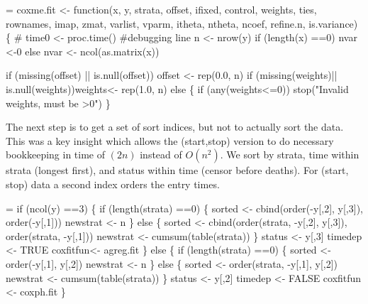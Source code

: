 \documentclass{article}
\begin{document}
\begin{nwchunk}
=
 coxme.fit <- function(x, y, strata, offset, ifixed, control,
                         weights, ties, rownames, 
                         imap, zmat, varlist, vparm, itheta,
                         ntheta, ncoef, refine.n, is.variance) \{
     #     time0 <- proc.time() #debugging line
     n <-  nrow(y)
     if (length(x) ==0) nvar <-0
     else nvar <- ncol(as.matrix(x))
     
     if (missing(offset) || is.null(offset)) offset <- rep(0.0, n)
     if (missing(weights)|| is.null(weights))weights<- rep(1.0, n)
     else \{
         if (any(weights<=0)) stop("Invalid weights, must be >0")
         \}
\end{nwchunk}
The next step is to get a set of sort indices, but not to actually
sort the data.  This was a key insight which allows the (start,stop)
version to do necessary bookkeeping in time of $(2n)$ instead of $O(n^2)$.
We sort by strata, time within strata (longest first), and status within
time (censor before deaths).  For (start, stop) data a second index 
orders the entry times.
\begin{nwchunk}
=
     if (ncol(y) ==3) \{
         if (length(strata) ==0) \{
             sorted <- cbind(order(-y[,2], y[,3]), 
                             order(-y[,1]))
             newstrat <- n
             \}
         else \{
             sorted <- cbind(order(strata, -y[,2], y[,3]),
                             order(strata, -y[,1]))
             newstrat  <- cumsum(table(strata))
             \}
         status <- y[,3]
         timedep <- TRUE
         coxfitfun<- agreg.fit
         \}
     else \{
         if (length(strata) ==0) \{
             sorted <- order(-y[,1], y[,2])
             newstrat <- n
             \}
         else \{
             sorted <- order(strata, -y[,1], y[,2])
             newstrat <-  cumsum(table(strata))
             \}
         status <- y[,2]
         timedep <- FALSE
         coxfitfun <- coxph.fit
         \}
\end{nwchunk}
\end{document}
